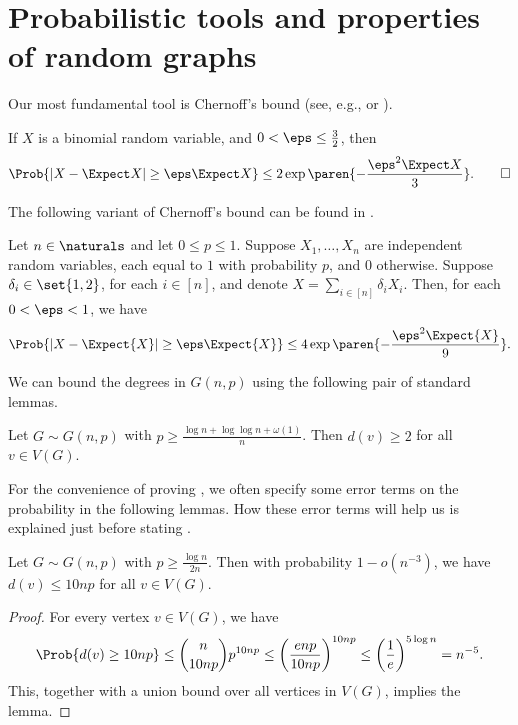 \documentclass[10pt,a4paper,reqno]{amsart}
\begin{document}
\bigskip \section{Probabilistic tools and properties of random graphs}
\label{sec:prop-binom-rand}
Our most fundamental tool is Chernoff's bound (see, e.g., \cite[Corollary~2.3]{janson2011random} or \cite[Lemma~2.2]{Montgomery2019resilient}).
\begin{lemma}
  \label{lem:chernoff}
  If $X$ is a binomial random variable, and $0 < \eps \leq \frac{3}{2}$, then
  \begin{equation*}
    \Prob{|X - \Expect X| \geq \eps \Expect X} \leq 2 \exp{\paren{-\frac{\eps^2 \Expect X}{3}}}. \qed
  \end{equation*}
\end{lemma}

The following variant of Chernoff's bound can be found in \cite[Proposition~2.3]{Montgomery2019resilient}.
\begin{proposition}
  \label{prop:weird-chernoff}
  Let $n \in \naturals$ and let $0 \leq p \leq 1$.
  Suppose $X_1, \dots, X_n$ are independent random variables, each
  equal to $1$ with probability $p$, and $0$
  otherwise. Suppose $\delta_i \in \set{1, 2}$, for each $i \in [n]$,
  and denote $X = \sum_{i \in [n]} \delta_i X_i$. Then, for each $0 <
  \eps < 1$, we have
  \begin{equation*}
    \Prob{|X - \Expect{X}| \geq \eps \Expect{X}} \leq 4
    \exp\paren{-\frac{\eps^2 \Expect{X}}{9}}.
  \end{equation*}
\end{proposition}

We can bound the degrees in $G(n,p)$ using the following pair of standard lemmas. 
\begin{lemma}\label{lem:lower_bound_degrees}
    Let $G \sim G(n,p)$ with $p \ge \frac{\log{n} + \log\log{n} + \omega(1)}{n}$. Then \whp $d(v) \ge 2$ for all $v \in V(G)$. 
\end{lemma}
For the convenience of proving , we often specify some error terms on the probability in the following lemmas. How these error terms will help us is explained just before stating .
\begin{lemma}\label{lem:upper_bound_degrees}
    Let $G \sim G(n,p)$ with $p \ge \frac{\log{n}}{2n}$. Then with probability $1-o(n^{-3})$, we have $d(v) \le 10np$  for all $v \in V(G)$.
\end{lemma}
\begin{proof}
For every vertex $v\in V(G)$, we have
\[
\Prob{d(v)\ge 10np}\le \binom{n}{10np}p^{10np}\le \left(\frac{enp}{10np}\right)^{10np}\le \left(\frac{1}{e}\right)^{5\log n}=n^{-5}.
\]
This, together with a union bound over all vertices in $V(G)$, implies the lemma.
\end{proof}
\end{document}

